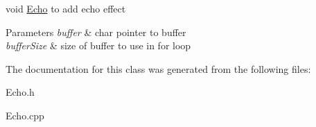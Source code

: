 void \hyperlink{classEcho}{Echo} to add echo effect 


\begin{DoxyParams}{Parameters}
{\em buffer} & char pointer to buffer \\
\hline
{\em buffer\+Size} & size of buffer to use in for loop \\
\hline
\end{DoxyParams}


The documentation for this class was generated from the following files\+:\begin{DoxyCompactItemize}
\item 
Echo.\+h\item 
Echo.\+cpp\end{DoxyCompactItemize}
